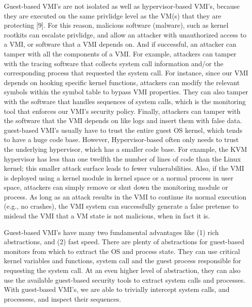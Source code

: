 \documentclass{report}
\begin{document}
\begin{spacing}{1.5}
{\large
Guest-based VMI's are not isolated as well as hypervisor-based VMI's, because they are executed on the same privlidge level as the VM(s) that they are protecting [9]. For this reason, malicious software (malware), such as kernel rootkits can escalate privlidge, and allow an attacker with unauthorized access to a VMI, or software that a VMI depends on. And if successful, an attacker can tamper with all the components of a VMI. For example, attackers can tamper with the tracing software that collects system call information and/or the corresponding process that requested the system call. For instance, since our VMI depends on hooking specific kernel functions, attackers can modify the relevant symbols within the symbol table to bypass VMI properties. They can also tamper with the software that handles sequences of system calls, which is the monitoring tool that enforces our VMI's security policy. Finally, attackers can tamper with the software that the VMI depends on like logs and insert them with false data. guest-based VMI's usually have to trust the entire guest OS kernel, which tends to have a huge code base. However, Hypervisor-based often only needs to trust the underlying hypervisor, which has a smaller code base. For example, the KVM hypervisor has less than one twelfth the number of lines of code than the Linux kernel; this smaller attack surface leads to fewer vulnerabilities. Also, if the VMI is deployed using a kernel module in kernel space or a normal process in user space, attackers can simply remove or shut down the monitoring module or process. As long as an attack results in the VMI to continue its normal execution (e.g., no crashes), the VMI system can successfully generate a false pretense to mislead the VMI that a VM state is not malicious, when in fact it is.
\newline
}


{\large
Guest-based VMI's have many two fundamental advantages like (1) rich abstractions, and (2) fast speed. There are plenty of abstractions for guest-based monitors from which to extract the OS and process state. They can use critical kernel variables and functions, system call and the guest process responsible for requesting the system call. At an even higher level of abstraction, they can also use the available guest-based security tools to extract system calls and processes. With guest-based VMI's, we are able to trivially intercept system calls, and processess, and inspect their sequences.
\newline
}




\end{spacing}
\end{document}
